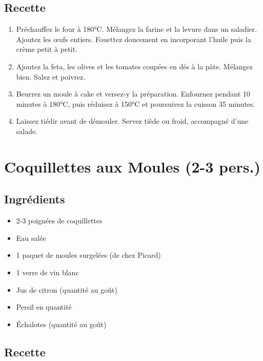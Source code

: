 \subsection{Recette}\label{recette-1}

\begin{enumerate}
\def\labelenumi{\arabic{enumi}.}

\item
  Préchauffez le four à 180°C. Mélangez la farine et la levure dans un
  saladier. Ajoutez les œufs entiers. Fouettez doucement en incorporant
  l'huile puis la crème petit à petit.
\item
  Ajoutez la feta, les olives et les tomates coupées en dés à la pâte.
  Mélangez bien. Salez et poivrez.
\item
  Beurrez un moule à cake et versez-y la préparation. Enfournez pendant
  10 minutes à 180°C, puis réduisez à 150°C et poursuivez la cuisson 35
  minutes.
\item
  Laissez tiédir avant de démouler. Servez tiède ou froid, accompagné
  d'une salade.
\end{enumerate}

\section{Coquillettes aux Moules (2-3
pers.)}\label{coquillettes-aux-moules-2-3-pers.}

\subsection{Ingrédients}\label{ingruxe9dients-2}

\begin{itemize}

\item
  2-3 poignées de coquillettes
\item
  Eau salée
\item
  1 paquet de moules surgelées (de chez Picard)
\item
  1 verre de vin blanc
\item
  Jus de citron (quantité au goût)
\item
  Persil en quantité
\item
  Échalotes (quantité au goût)
\end{itemize}

\subsection{Recette}\label{recette-2}

